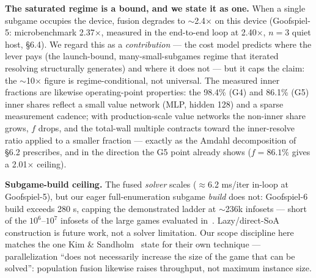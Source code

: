 \documentclass[11pt]{article}
\begin{document}
\textbf{The saturated regime is a bound, and we state it as one.} When a single subgame
occupies the device, fusion degrades to $\sim$2.4$\times$ on this device (Goofspiel-5:
microbenchmark 2.37$\times$, measured in the end-to-end loop at 2.40$\times$, $n{=}3$
quiet host, \S6.4). We regard this as a \emph{contribution} --- the cost model predicts
where the lever pays (the launch-bound, many-small-subgames regime that iterated
resolving structurally generates) and where it does not --- but it caps the claim: the
$\sim$10$\times$ figure is regime-conditional, not universal. The measured inner
fractions are likewise operating-point properties: the 98.4\% (G4) and 86.1\% (G5)
inner shares reflect a small value network (MLP, hidden 128) and a sparse measurement
cadence; with production-scale value networks the non-inner share grows, $f$ drops, and
the total-wall multiple contracts toward the inner-resolve ratio applied to a smaller
fraction --- exactly as the Amdahl decomposition of \S6.2 prescribes, and in the
direction the G5 point already shows ($f = 86.1\%$ gives a 2.01$\times$ ceiling).

\textbf{Subgame-build ceiling.} The fused \emph{solver} scales ($\approx$6.2 ms/iter
in-loop at Goofspiel-5), but our eager full-enumeration subgame \emph{build} does not:
Goofspiel-6 build exceeds 280 s, capping the demonstrated ladder at $\sim$236k infosets
--- short of the $10^6$--$10^7$ infosets of the large games evaluated
in~\citep{Rudolph2025}. Lazy/direct-SoA construction is future work, not a solver
limitation. Our scope discipline here matches the one Kim \&
Sandholm~\citep{KimSandholm2026} state for
their own technique --- parallelization ``does not necessarily increase the size of the
game that can be solved'': population fusion likewise raises throughput, not maximum
instance size.
\end{document}
